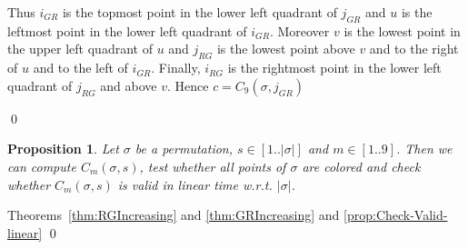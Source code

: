 \documentclass[11pt]{article}
\newenvironment{pf}{{\em \noindent Proof:}}{ \hfill \qed\smallskip}
\newcommand{\Vpoint}[2]{\draw (#1,#2) [darkgreen,fill=darkgreen] circle (3pt);}
\newcommand{\Hpoint}[2]{\draw (#1,#2) [darkred,fill=darkred] circle (3pt);}
\newcommand{\zoneRG}[3]{
\draw [very thick,H,Hpoint] (#1,#2) -- +(-#3,0);
\draw [very thick,V,Vpoint] (#1,#2) -- +(0,#3);
\draw [Hfill] (#1,#2) -- +(-#3,#3) -- +(-#3,0);
\draw [Vfill] (#1,#2) -- +(-#3,#3) -- + (0,#3);
}
\newcommand{\zoneGR}[3]{
\draw [very thick,H,Hpoint] (#1,#2) -- +(-#3,0);
\draw [very thick,V,Vpoint] (#1,#2) -- +(0,#3);
\draw [Vfill] (#1,#2) -- +(-#3,#3) -- +(-#3,0);
\draw [Hfill] (#1,#2) -- +(-#3,#3) -- + (0,#3);
}
\newtheorem{prop}[thm]{Proposition}
\begin{document}
\begin{pf}
\begin{minipage}{.2\textwidth}
\end{minipage}
\begin{minipage}{.75\textwidth}
Thus $i_{GR}$ is the topmost point in the lower left quadrant of $j_{GR}$ and 
$u$ is the leftmost point in the lower left quadrant of $i_{GR}$. 
Moreover $v$ is the lowest point in the upper left quadrant of $u$ and 
$j_{RG}$ is the lowest point above $v$ and to the right of $u$ and to the left of $i_{GR}$.
Finally, $i_{RG}$ is the rightmost point in the lower left quadrant of $j_{RG}$ and above $v$. 
Hence $c = C_9(\sigma, j_{GR})$
\end{minipage}
\end{pf}

\begin{prop}\label{prop:linearTestC_numero}
Let $\sigma$ be a permutation, $s \in [1..|\sigma|]$ and $m \in [1..9]$. 
Then we can compute $C_m(\sigma, s)$, test whether all points of $\sigma$ are colored and check whether $C_m(\sigma, s)$ is valid
in linear time w.r.t. $|\sigma|$.
\end{prop}

\begin{pf}
Theorems~\ref{thm:RGIncreasing} and \ref{thm:GRIncreasing} and \ref{prop:Check-Valid-linear}
\end{pf}
\end{document}
